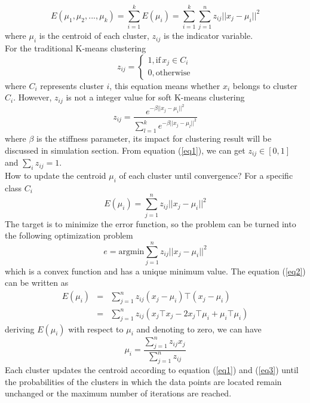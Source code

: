 \documentclass[journal,twoside,web]{ieeecolor}
\begin{document}
\begin{equation}
E\left(\mu_1,\mu_2,...,\mu_k\right) = \sum_{i=1}^{k}E\left(\mu_i\right) = \sum_{i=1}^{k}\sum_{j=1}^{n}z_{ij} ||x_j-\mu_i||^2
\end{equation}
where $\mu_i$ is the centroid of each cluster, $z_{ij}$ is the indicator variable. \\ 
For the traditional K-means clustering
\begin{equation}
z_{ij} = \left\{ \begin{array}{ll}
1, \text{if}\,x_{j} \in C_{i}\\
0, \text{otherwise}
\end{array} \right.
\end{equation}
where $C_{i}$ represents cluster $i$, this equation means whether $x_{i}$ belongs to cluster $C_{i}$. However, $z_{ij}$ is not a integer value for soft K-means clustering 
\begin{equation}
\label{eq1}
z_{ij} = \frac{e^{-\beta ||x_{j}-\mu_i||^2}}{\sum_{l=1}^{k}e^{-\beta||x_{j}-\mu_l||^2}}
\end{equation}
where $\beta$ is the stiffness parameter, its impact for clustering result will be discussed in simulation section. 
From equation (\ref{eq1}), we can get $z_{ij} \in [0,1]$ and $\sum_{i}z_{ij}=1$.\\
How to update the centroid $\mu_{i}$ of each cluster until convergence? For a specific class $C_{i}$
\begin{equation}
\label{eq2}
E\left(\mu_{i}\right) = \sum_{j=1}^{n}z_{ij}||x_{j}-\mu_{i}||^2
\end{equation}
The target is to minimize the error function, so the problem can be turned into the following optimization problem
\begin{equation}
e = \text{argmin}\sum_{j=1}^{n}z_{ij}||x_{j}-\mu_{i}||^2
\end{equation}
which is a convex function and has a unique minimum value. The equation (\ref{eq2}) can be written as
\begin{eqnarray}
E\left(\mu_{i}\right) &=& \sum_{j=1}^{n}z_{ij}\left(x_j-\mu_{i}\right)\top \left(x_j-\mu_{i}\right)\\
&=& \sum_{j=1}^{n}z_{ij}\left(x_j \top x_j-2x_j \top \mu_{i} + \mu_{i} \top \mu_{i}\right)
\end{eqnarray}
deriving $E\left(\mu_{i}\right)$ with respect to $\mu_{i}$ and denoting to zero, we can have
\begin{equation}
\label{eq3}
\mu_{i} = \frac{\sum_{j=1}^{n}z_{ij}x_j}{\sum_{j=1}^{n}z_{ij}}
\end{equation}
Each cluster updates the centroid according to equation (\ref{eq1}) and (\ref{eq3}) until the probabilities of the clusters in which the data points are located remain unchanged or the maximum number of iterations are reached.
\end{document}
